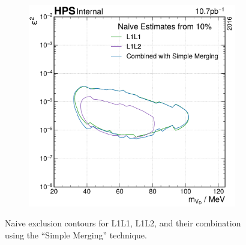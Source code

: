 \begin{figure}
  \centering
  \begin{subfigure}{0.48\textwidth}
    \includegraphics[width=\textwidth]{figures/hps/analysis/results/excl-combination.pdf}
  \end{subfigure}
  \caption{%
    Naive exclusion contours for L1L1, L1L2, and their combination
    using the ``Simple Merging'' technique.
  }
  \label{fig:combine-comp}
\end{figure}
